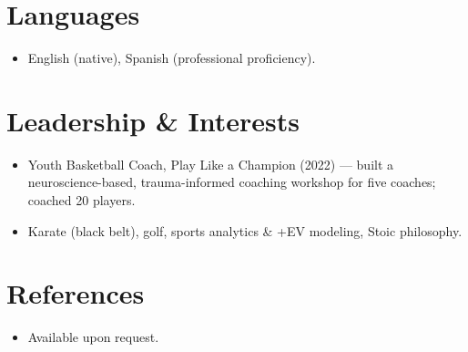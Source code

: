 \documentclass[11pt,letterpaper,sans]{moderncv}
\begin{document}
\section{Languages}
\vspace{1pt}
\begin{itemize}
\item English (native), Spanish (professional proficiency).
\end{itemize}


\section{Leadership \& Interests}
\vspace{1pt}
\begin{itemize}
\item Youth Basketball Coach, Play Like a Champion (2022) --- built a neuroscience-based, trauma-informed coaching workshop for five coaches; coached 20 players.
\item Karate (black belt), golf, sports analytics \& +EV modeling, Stoic philosophy.
\end{itemize}


\section{References}
\vspace{1pt}
\begin{itemize}
\item{Available upon request.}
\end{itemize}
\end{document}
